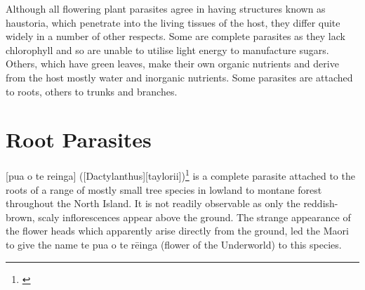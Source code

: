 Although all flowering plant parasites agree in having structures known as haustoria, which penetrate into the living tissues of the host, they differ quite widely in a number of other respects.
Some are complete parasites as they lack chlorophyll and so are unable to utilise light energy to manufacture sugars.
Others, which have green leaves, make their own organic nutrients and derive from the host mostly water and inorganic nutrients.
Some parasites are attached to roots, others to trunks and branches.

\section{Root Parasites}

[pua o te reinga] ([Dactylanthus][taylorii])\footnote{\cite{moore1940structure}} is a complete parasite attached to the roots of a range of mostly small tree species in lowland to montane forest throughout the North Island.
It is not readily observable as only the reddish-brown, scaly inflorescences appear above the ground.
The strange appearance of the flower heads which apparently arise directly from the ground, led the Maori to give the name te pua o te rēinga (flower of the Underworld) to this species.

